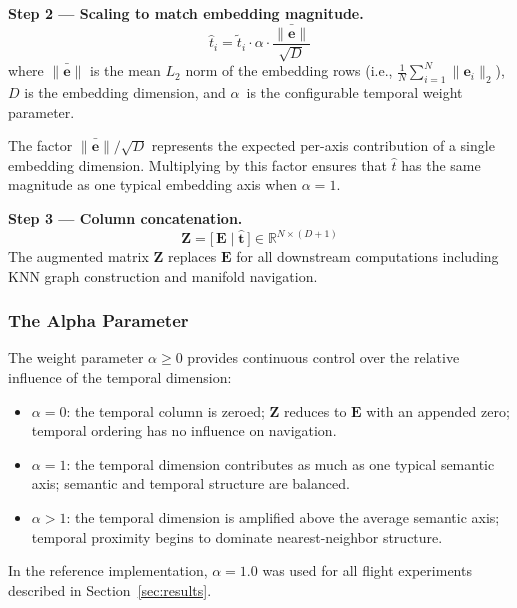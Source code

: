 \documentclass[12pt,letterpaper]{article}
\newcommand{\alphabar}{$\alpha$}
\begin{document}
\textbf{Step 2 --- Scaling to match embedding magnitude.}
\begin{equation}
  \hat{t}_i = \tilde{t}_i \cdot \alpha \cdot \frac{\bar{\|\mathbf{e}\|}}{\sqrt{D}}
  \label{eq:scale}
\end{equation}
where $\bar{\|\mathbf{e}\|}$ is the mean $L_2$ norm of the embedding rows
(i.e., $\frac{1}{N}\sum_{i=1}^{N} \|\mathbf{e}_i\|_2$), $D$ is the embedding
dimension, and \alphabar\ is the configurable temporal weight parameter.

The factor $\bar{\|\mathbf{e}\|}/\sqrt{D}$ represents the expected per-axis
contribution of a single embedding dimension. Multiplying by this factor ensures
that $\hat{t}$ has the same magnitude as one typical embedding axis when
$\alpha = 1$.

\textbf{Step 3 --- Column concatenation.}
\begin{equation}
  \mathbf{Z} = \bigl[\,\mathbf{E} \mid \hat{\mathbf{t}}\,\bigr]
  \in \mathbb{R}^{N \times (D+1)}
  \label{eq:augment}
\end{equation}
The augmented matrix $\mathbf{Z}$ replaces $\mathbf{E}$ for all downstream
computations including KNN graph construction and manifold navigation.

\subsubsection{The Alpha Parameter}

The weight parameter $\alpha \geq 0$ provides continuous control over the
relative influence of the temporal dimension:

\begin{itemize}[noitemsep]
  \item $\alpha = 0$: the temporal column is zeroed; $\mathbf{Z}$ reduces to
    $\mathbf{E}$ with an appended zero; temporal ordering has no influence on
    navigation.
  \item $\alpha = 1$: the temporal dimension contributes as much as one
    typical semantic axis; semantic and temporal structure are balanced.
  \item $\alpha > 1$: the temporal dimension is amplified above the average
    semantic axis; temporal proximity begins to dominate nearest-neighbor
    structure.
\end{itemize}

In the reference implementation, $\alpha = 1.0$ was used for all flight
experiments described in Section~\ref{sec:results}.
\end{document}

